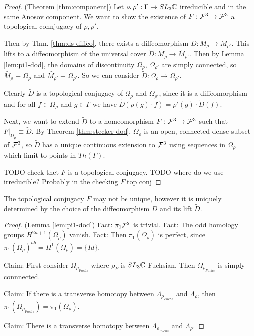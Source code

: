 \begin{proof}(Theorem \ref{thm:component})
    Let $\rho,\rho' : \Gamma \rightarrow SL_3\mathbb{C}$ irreducible and in the same Anosov component.
    We want to show the existence of $F:\mathcal{F}^3 \rightarrow \mathcal{F}^3$ 
    a topological connjugacy of $\rho,\rho'$.

    Then by Thm. \ref{thm:ds-diffeo}, there exists a diffeomorphism 
    $D : M_\rho \rightarrow M_{\rho'}$.
    This lifts to a diffeomorphism of the universal cover 
    $\tilde{D} : \tilde{M_\rho} \rightarrow \tilde{M_{\rho'}}$.
    Then by Lemma \ref{lem:pi1-dod}, 
    the domains of discontinuity $\Omega_\rho$, $\Omega_{\rho'}$ are simply connected,
    so $\tilde{M_\rho} \equiv \Omega_\rho$ and $\tilde{M_{\rho'}} \equiv \Omega_{\rho'}$.
    So we can consider $\tilde{D} : \Omega_\rho \rightarrow \Omega_{\rho'}$.
    
    Clearly $\tilde{D}$ is a topological conjugacy of $\Omega_\rho$ and $\Omega_{\rho'}$, 
    since it is a diffeomorphism and for all $f \in \Omega_\rho$ and $g \in \Gamma$ we have
    $\tilde{D}(\rho(g)\cdot f) = \rho'(g)\cdot \tilde{D}(f)$.

    Next, we want to extend $\tilde{D}$ to a homeomorphism $F: \mathcal{F}^3 \rightarrow \mathcal{F}^3$
    such that $F|_{\Omega_\rho} \equiv \tilde{D}$.
    By Theorem \ref{thm:stecker-dod},
    $\Omega_\rho$ is an open, connected dense subset of $\mathcal{F}^3$, 
    so $\tilde{D}$ has a unique continuous extension to $\mathcal{F}^3$
    using sequences in $\Omega_\rho$ which limit to points in $Th(\Gamma)$. 

    TODO check thet $F$ is a topological conjugacy.
    TODO where do we use irreducible? Probably in the checking $F$ top conj
\end{proof}

\begin{remark}
    The topological conjugacy $F$ may not be unique, 
    however it is uniquely determined by the choice of
    the diffeomorphism $D$ and its lift $\tilde{D}$. 
\end{remark}

\begin{proof}(Lemma \ref{lem:pi1-dod})
    Fact: $\pi_1 \mathcal{F}^3$ is trivial.
    Fact: The odd homology groups $H^{2n+1}(\Omega_\rho)$ vanish.
    Fact: Then $\pi_1(\Omega_\rho)$ is perfect, 
    since $\pi_1(\Omega_\rho)^{ab} = H^1(\Omega_\rho) = \{Id\}$.

    Claim: First consider $\Omega_{\rho_{Fuchs}}$ where $\rho_F$ is $SL_3\mathbb{C}$-Fuchsian. 
    Then $\Omega_{\rho_{Fuchs}}$ is simply connnected.

    Claim: If there is a transverse homotopy between $\Lambda_{\rho_{Fuchs}}$ and $\Lambda_\rho$, 
    then $\pi_1(\Omega_{\rho_{Fuchs}}) = \pi_1(\Omega_\rho)$.

    Claim: There is a transverse homotopy between $\Lambda_{\rho_{Fuchs}}$ and $\Lambda_\rho$.
\end{proof}

